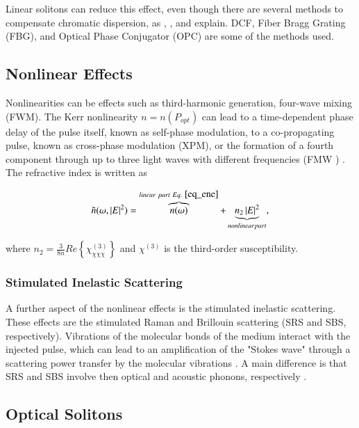         Linear solitons can reduce this effect, even though there are several methods to compensate chromatic dispersion, as \cite{AgrawalBook}, \cite{dudley_taylor_2010},  and \citep{Udayakumar2013ChromaticDC} explain.
        \gls{DCF}, Fiber Bragg Grating (FBG), and Optical Phase Conjugator (OPC) are some of the methods used.
        
       

    \subsection{Nonlinear Effects}

        Nonlinearities can be effects such as third-harmonic generation, four-wave mixing (FWM). The Kerr nonlinearity $n = n(P_{opt})$
        can lead to a time-dependent phase delay of the pulse itself, known as self-phase modulation, to a co-propagating pulse, known as cross-phase modulation (XPM), or the formation of a fourth component through up to three light waves with different frequencies (FMW ) \cite{rein}. The refractive index is written as
        
        
        \begin{equation}
            \tilde{n} (\omega, \left| E \right|^2) = \overbrace{n(\omega)}^{linear \ part \ Eq. \ \eqref{eq_ene}} + \underbrace{ n_2 \left| E \right|^2}_{nonlinear part},
        \end{equation} 
       
       where $n_2 = \frac{3}{8n}Re\left\{ \chi^{(3)}_{\chi \chi \chi}\right\}$ and $\chi^{(3)}$ is the third-order susceptibility.
   
   \subsubsection{Stimulated Inelastic Scattering}
        A further aspect of the nonlinear effects is the stimulated inelastic scattering. These effects are the stimulated Raman and Brillouin scattering (SRS and SBS, respectively). Vibrations of the molecular bonds of the medium interact with the injected pulse, which can lead to an amplification of the "Stokes wave" through a scattering power transfer by the molecular vibrations \cite{rein}. A main difference is that SRS and SBS involve then optical and acoustic phonons, respectively \cite{AgrawalBook}.
        
    \subsection{Optical Solitons}
    
